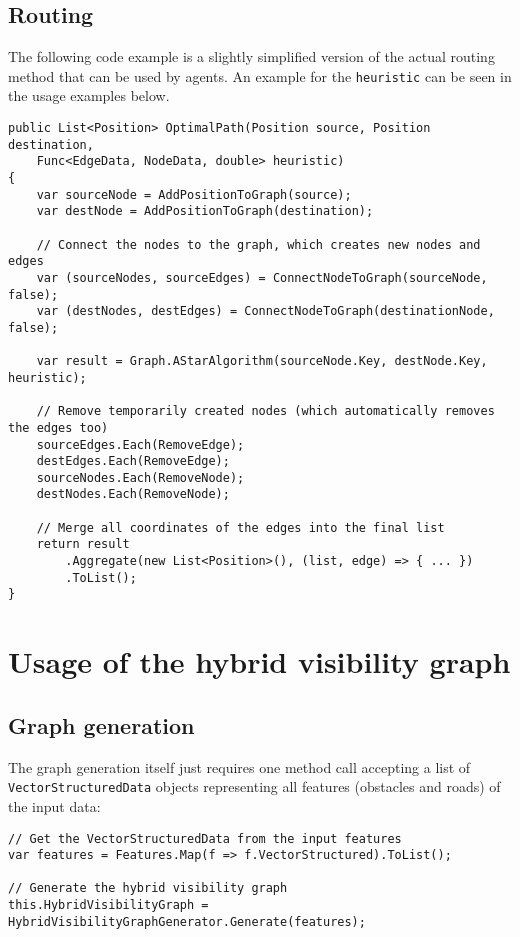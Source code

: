 	\subsection*{Routing}
	
		The following code example is a slightly simplified version of the actual routing method that can be used by agents.
		An example for the \texttt{heuristic} can be seen in the usage examples below.
		
		\begin{verbatim}
public List<Position> OptimalPath(Position source, Position destination,
	Func<EdgeData, NodeData, double> heuristic)
{
	var sourceNode = AddPositionToGraph(source);
	var destNode = AddPositionToGraph(destination);
	
	// Connect the nodes to the graph, which creates new nodes and edges
	var (sourceNodes, sourceEdges) = ConnectNodeToGraph(sourceNode, false);
	var (destNodes, destEdges) = ConnectNodeToGraph(destinationNode, false);
	
	var result = Graph.AStarAlgorithm(sourceNode.Key, destNode.Key, heuristic);
	
	// Remove temporarily created nodes (which automatically removes the edges too)
	sourceEdges.Each(RemoveEdge);
	destEdges.Each(RemoveEdge);
	sourceNodes.Each(RemoveNode);
	destNodes.Each(RemoveNode);
	
	// Merge all coordinates of the edges into the final list
	return result
		.Aggregate(new List<Position>(), (list, edge) => { ... })
		.ToList();
}
		\end{verbatim}

\section*{Usage of the hybrid visibility graph}
	
	\subsection*{Graph generation}
	
		The graph generation itself just requires one method call accepting a list of \texttt{VectorStructuredData} objects representing all features (obstacles and roads) of the input data:
	
		\begin{verbatim}
// Get the VectorStructuredData from the input features
var features = Features.Map(f => f.VectorStructured).ToList();

// Generate the hybrid visibility graph
this.HybridVisibilityGraph = HybridVisibilityGraphGenerator.Generate(features);
		\end{verbatim}
		
